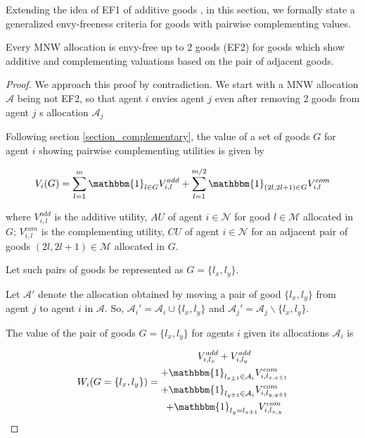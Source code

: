 Extending the idea of EF1 of additive goods \cite{caragiannis2016unreasonable}, in this section, we formally state a generalized envy-freeness criteria for goods with pairwise complementing values.

\begin{theorem}
Every MNW allocation is envy-free up to 2 goods (EF2) for goods which show additive and complementing valuations based on the pair of adjacent goods.
\end{theorem}

\begin{proof}
We approach this proof by contradiction. We start with a MNW allocation $\mathcal{A}$ being not EF2, so that agent $i$ envies agent $j$ even after removing 2 goods from agent $j$
s allocation $\mathcal{A}_j$

Following section \ref{section_complementary}, the value of a set of goods $G$ for agent $i$ showing pairwise complementing utilities is given by

\[
    V_i(G) = \sum_{l=1}^m \mathbbm{1}_{l \in G}V_{i,l}^{add} + \sum_{l=1}^{m/2} \mathbbm{1}_{\left(2l,2l+1\right) \in G}V_{i,l}^{com}
\]

where $V_{i,l}^{add}$ is the additive utility, $AU$ of agent $i \in \mathcal{N}$ for good $l \in \mathcal{M}$ allocated in $G$; $V_{i,l}^{com}$ is the complementing utility, $CU$ of agent $i \in \mathcal{N}$ for an adjacent pair of goods $\left(2l,2l+1\right) \in \mathcal{M}$ allocated in $G$.

Let such pairs of goods be represented as $G = \{l_x, l_y\}$.

Let $\mathcal{A}'$ denote the allocation obtained by moving a pair of good $\{l_x, l_y\}$ from agent $j$ to agent $i$ in $\mathcal{A}$. So, $\mathcal{A}_i' = \mathcal{A}_i \cup \{l_x, l_y\} $ and $\mathcal{A}_j' = \mathcal{A}_j\backslash \{l_x, l_y\}$.

The value of the pair of goods $G = \{l_x, l_y\}$ for agents $i$ given its allocations $\mathcal{A}_i$ is

\[
    W_i(G=\{l_x,l_y\}) = 
    \begin{gathered}
        V_{i,l_x}^{add} + V_{i,l_y}^{add} \\
        + \mathbbm{1}_{l_{x \pm 1} \in \mathcal{A}_i}V_{i,l_{x,x\pm 1}}^{com} \\
        + \mathbbm{1}_{l_{y \pm 1} \in \mathcal{A}_i}V_{i,l_{y,y\pm 1}}^{com} \\
        + \mathbbm{1}_{l_y = l_{x \pm 1}}V_{i,l_{x,y}}^{com}
    \end{gathered}
\]


\end{proof}
